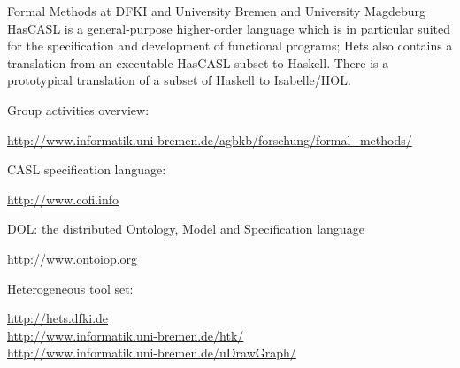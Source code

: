 \begin{hcarentry}[section]{Formal Methods at DFKI and University Bremen and University Magdeburg}
HasCASL is a general-purpose higher-order language which is in particular
suited for the specification and development of functional programs; Hets also
contains a translation from an executable HasCASL subset to Haskell. There is
a prototypical translation of a subset of Haskell to Isabelle/HOL.

\FurtherReading
\begin{compactitem}
\item Group activities overview:

\url{http://www.informatik.uni-bremen.de/agbkb/forschung/formal\_methods/}

\item CASL specification language:

\url{http://www.cofi.info}

\item DOL: the distributed Ontology, Model and Specification language

\url{http://www.ontoiop.org}

\item Heterogeneous tool set:

\url{http://hets.dfki.de}\\
\url{http://www.informatik.uni-bremen.de/htk/}\\
\url{http://www.informatik.uni-bremen.de/uDrawGraph/}
\end{compactitem}
\end{hcarentry}
